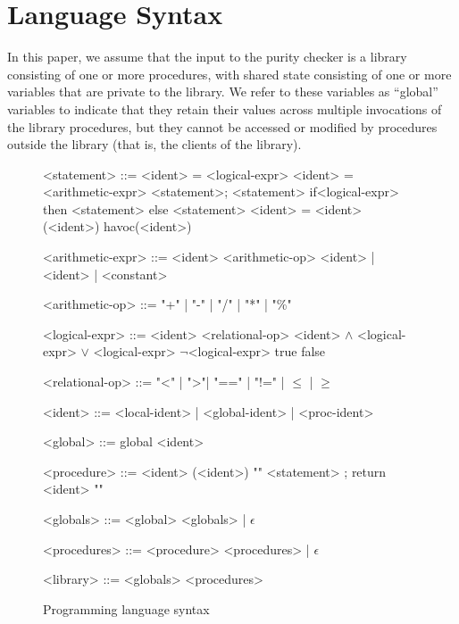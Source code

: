 \section{Language Syntax}
\label{sec:background}

In this paper, we assume that the input to the purity checker is a library consisting
of one or more procedures, with shared state consisting of one or more variables
that are private to the library. We refer to these variables as ``global'' variables to
indicate that they retain their values across multiple invocations of the library
procedures, but they cannot be accessed or modified by procedures outside
the library (that is, the clients of the library).

\begin{figure}[t!]
  \begin{grammar}
    <statement> ::= <ident> = <logical-expr>
    \alt <ident> = <arithmetic-expr>
    \alt <statement>; <statement>
    \alt if<logical-expr> then <statement> else <statement>
    \alt <ident> = <ident> (<ident>)
    \alt havoc(<ident>)


    <arithmetic-expr> ::= <ident> <arithmetic-op> <ident> | <ident> | <constant>

     <arithmetic-op> ::= "+"  |  "-"  |  "/"  |  "*" |  "\%"
 
    <logical-expr> ::= <ident> <relational-op> <ident>
     $\wedge$ <logical-expr>
     $\vee$ <logical-expr>
    \alt $\neg$<logical-expr>
    \alt true
    \alt false

     <relational-op> ::= "<" | ">"| "==" | "!=" | $\leq$ | $\geq$

    <ident> ::= <local-ident> | <global-ident> | <proc-ident>
 
    <global> ::= global <ident>   

    <procedure> ::= <ident> (<ident>) "{" <statement> ; return <ident> "}"

    <globals> ::= <global> <globals> | $\epsilon$

    <procedures> ::= <procedure> <procedures> | $\epsilon$

    <library> ::= <globals> <procedures>
  \end{grammar}
  \caption{Programming language syntax}
  \label{fig:grammar}
\end{figure}

